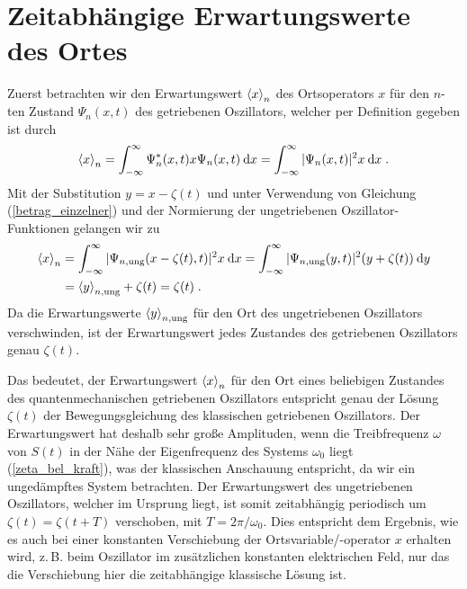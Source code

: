   \section{Zeitabhängige Erwartungswerte des Ortes}
    Zuerst betrachten wir den Erwartungswert $\braket{x}_n$ des Ortsoperators $x$ für den $n$-ten Zustand $\Psi_n(x,t)$ des getriebenen Oszillators, welcher per Definition gegeben ist durch
    \begin{equation}
      \braket{x}_n = \int_{-\infty}^{\infty} \Psi_n^*(x,t)x\Psi_n(x,t) \: \text dx
      = \int_{-\infty}^{\infty} |\Psi_n(x,t)|^2 x \: \text dx \; .
    \end{equation}
    Mit der Substitution $y=x-\zeta(t)$ und unter Verwendung von Gleichung (\ref{betrag_einzelner}) und der Normierung der ungetriebenen Oszillator-Funktionen gelangen wir zu
    \begin{align}
      \begin{split}
        \braket{x}_n &= \int_{-\infty}^{\infty} |\Psi_{n,\text{ung}}(x-\zeta(t),t)|^2 x \: \text dx
        = \int_{-\infty}^{\infty} |\Psi_{n,\text{ung}}(y,t)|^2 (y+\zeta(t)) \: \text dy \\
        &= \braket{y}_{n,\text{ung}} + \zeta(t) = \zeta(t) \; .
        \label{erwartungswert_x_einzelner}
      \end{split}
    \end{align}
    Da die Erwartungswerte $\braket{y}_{n,\text{ung}}$ für den Ort des ungetriebenen Oszillators verschwinden, ist der Erwartungswert jedes Zustandes des getriebenen Oszillators genau $\zeta(t)$.

    Das bedeutet, der Erwartungswert $\braket{x}_n$ für den Ort eines beliebigen Zustandes des quantenmechanischen getriebenen Oszillators entspricht genau der Lösung $\zeta(t)$ der Bewegungsgleichung des klassischen getriebenen Oszillators.
    Der Erwartungswert hat deshalb sehr große Amplituden, wenn die Treibfrequenz $\omega$ von $S(t)$ in der Nähe der Eigenfrequenz des Systems $\omega_0$ liegt (\ref{zeta_bel_kraft}), was der klassischen Anschauung entspricht, da wir ein ungedämpftes System betrachten.
    Der Erwartungswert des ungetriebenen Oszillators, welcher im Ursprung liegt, ist somit zeitabhängig periodisch um $\zeta(t)=\zeta(t+T)$ verschoben, mit $T=2\pi/\omega_0$.
    Dies entspricht dem Ergebnis, wie es auch bei einer konstanten Verschiebung der Ortsvariable/-operator $x$ erhalten wird, z.\,B. beim Oszillator im zusätzlichen konstanten elektrischen Feld, nur das die Verschiebung hier die zeitabhängige klassische Lösung ist.

